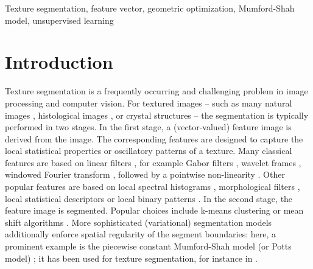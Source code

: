 \documentclass[journal]{IEEEtran}
\begin{document}
\begin{IEEEkeywords}
Texture segmentation, feature vector, geometric optimization,
Mumford-Shah model, unsupervised learning
\end{IEEEkeywords}






\IEEEpeerreviewmaketitle

\section{Introduction}



Texture segmentation
is a frequently occurring and challenging problem 
in image processing and computer vision.
For textured images -- such as many natural images \cite{martin2004learning, mobahi2011segmentation},  histological images \cite{mccann2014}, or crystal structures \cite{mevenkamp2016} -- 
the segmentation is typically performed in two stages.
In the first stage, a (vector-valued) feature image is 
derived from the image.
The corresponding features  
are designed to capture 
the local statistical properties or oscillatory patterns of a texture.
Many classical features are based on linear filters \cite{randen1999filtering},
for example Gabor filters \cite{jain1991unsupervised}, 
wavelet frames \cite{unser1995texture},
windowed Fourier transform \cite{azencott1997texture},
followed by a pointwise non-linearity \cite{unser1990nonlinear}. 
Other popular features are based on local spectral histograms \cite{liu2006image}, morphological filters \cite{xia2006morphology},
local statistical descriptors \cite{todorovic2009}
 or local binary patterns \cite{ojala2002multiresolution}.
In the second stage, 
the feature image is segmented.
Popular choices include k-means clustering \cite{jain1991unsupervised, unser1995texture}
or mean shift algorithms \cite{ozden2005image}.
More sophisticated (variational) segmentation models 
additionally enforce spatial regularity of the segment boundaries: 
here, a prominent example 
is the piecewise constant Mumford-Shah model (or Potts model) \cite{geman1984stochastic,mumford1989optimal}; 
it has been used for texture segmentation, for instance in \cite{rousson2003active, kato2006markov, storath2014unsupervised, mevenkamp2016}.
\end{document}
